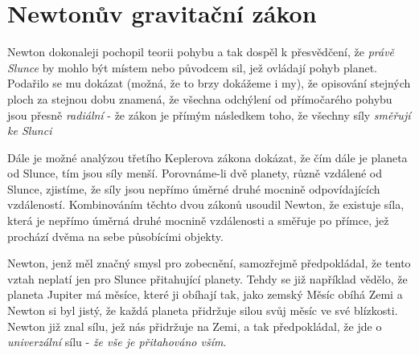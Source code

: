   \section{Newtonův gravitační zákon}
    Newton dokonaleji pochopil teorii pohybu a tak dospěl k přesvědčení, že \emph{právě Slunce} by 
    mohlo být místem nebo původcem sil, jež ovládají pohyb planet. Podařilo se mu dokázat (možná, 
    že to brzy dokážeme i my), že opisování stejných ploch za stejnou dobu znamená, že všechna 
    odchýlení od přímočarého pohybu jsou přesně \emph{radiální} - že zákon je přímým následkem 
    toho, že všechny síly \emph{směřují ke Slunci}
    
    Dále je možné analýzou třetího Keplerova zákona dokázat, že čím dále je planeta od Slunce, tím 
    jsou síly menší. Porovnáme-li dvě planety, různě vzdálené od Slunce, zjistíme, že síly jsou 
    nepřímo úměrné druhé mocnině odpovídajících vzdáleností. Kombinováním těchto dvou zákonů 
    usoudil Newton, že existuje síla, která je nepřímo úměrná druhé mocnině vzdálenosti a směřuje 
    po přímce, jež prochází dvěma na sebe působícími objekty.
    
    Newton, jenž měl značný smysl pro zobecnění, samozřejmě předpokládal, že tento vztah neplatí 
    jen pro Slunce přitahující planety. Tehdy se již například vědělo, že planeta Jupiter má 
    měsíce, které ji obíhají tak, jako zemský Měsíc obíhá Zemi a Newton si byl jistý, že každá 
    planeta přidržuje silou svůj měsíc ve své blízkosti. Newton již znal sílu, jež nás přidržuje na 
    Zemi, a tak předpokládal, že jde o \emph{univerzální} sílu - \emph{že vše je přitahováno vším}.
    
